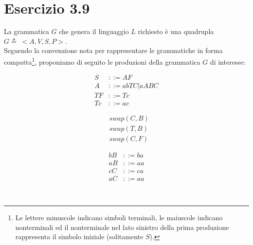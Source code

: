 \section*{Esercizio 3.9}

    
    La grammatica $G$ che genera il linguaggio $L$ richiesto è una quadrupla $G \triangleq \;<A,V,S,P>$.\\
    Seguendo la convenzione nota per rappresentare le grammatiche in forma compatta\footnote{Le lettere minuscole indicano simboli terminali, le maiuscole indicano nonterminali ed il nonterminale nel lato sinistro della prima produzione rappresenta il simbolo iniziale (solitamente $S$).}, proponiamo di seguito le produzioni della grammatica $G$ di interesse:

    \begin{minipage}{0.33\textwidth}
        \begin{align}
            S &::= AF\\
            A &::= abTC|aABC\\
            TF &::= Tc \label{eq:TF::=Tc}\\
            Tc &::= ac \label{eq:Tc::=ac}
        \end{align}
    \end{minipage}
    \begin{minipage}{0.33\textwidth}
        \begin{align}
            & swap(C,B) \label{eq:swap(C,B)}\\
            & swap(T,B) \label{eq:swap(T,B)}\\
            & swap(C,F) \label{eq:swap(C,F)}
        \end{align}
    \end{minipage}
    \begin{minipage}{0.33\textwidth}
        \begin{align}
            bB &::= ba \label{eq:bB::=ba}\\
            aB &::= aa \label{eq:aB::=aa}\\
            cC &::= ca \label{eq:cC::=ca}\\
            aC &::= aa
        \end{align}
    \end{minipage}\\
    
